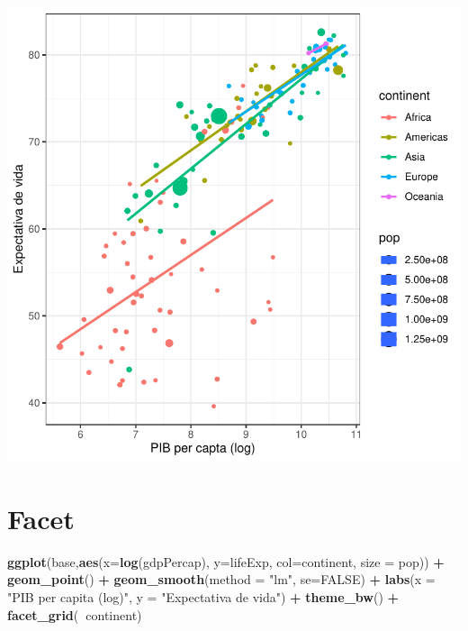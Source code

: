 \documentclass[
]{article}
\newenvironment{Shaded}{\begin{snugshade}}{\end{snugshade}}
\newcommand{\DataTypeTok}[1]{\textcolor[rgb]{0.13,0.29,0.53}{#1}}
\newcommand{\KeywordTok}[1]{\textcolor[rgb]{0.13,0.29,0.53}{\textbf{#1}}}
\newcommand{\NormalTok}[1]{#1}
\newcommand{\OperatorTok}[1]{\textcolor[rgb]{0.81,0.36,0.00}{\textbf{#1}}}
\newcommand{\OtherTok}[1]{\textcolor[rgb]{0.56,0.35,0.01}{#1}}
\newcommand{\StringTok}[1]{\textcolor[rgb]{0.31,0.60,0.02}{#1}}
\begin{document}
\begin{center}\includegraphics{arquivo_pdf_files/figure-latex/scatter4-1} \end{center}

\hypertarget{facet}{%
\section{Facet}\label{facet}}

\begin{Shaded}
\begin{Highlighting}[]
\KeywordTok{ggplot}\NormalTok{(base,}\KeywordTok{aes}\NormalTok{(}\DataTypeTok{x=}\KeywordTok{log}\NormalTok{(gdpPercap), }\DataTypeTok{y=}\NormalTok{lifeExp, }\DataTypeTok{col=}\NormalTok{continent,}
                \DataTypeTok{size =}\NormalTok{ pop)) }\OperatorTok{+}\StringTok{ }\KeywordTok{geom_point}\NormalTok{() }\OperatorTok{+}\StringTok{ }\KeywordTok{geom_smooth}\NormalTok{(}\DataTypeTok{method =} \StringTok{"lm"}\NormalTok{, }\DataTypeTok{se=}\OtherTok{FALSE}\NormalTok{) }\OperatorTok{+}\StringTok{ }
\StringTok{  }\KeywordTok{labs}\NormalTok{(}\DataTypeTok{x =} \StringTok{"PIB per capita (log)"}\NormalTok{, }\DataTypeTok{y =} \StringTok{"Expectativa de vida"}\NormalTok{) }\OperatorTok{+}\StringTok{ }\KeywordTok{theme_bw}\NormalTok{() }\OperatorTok{+}\StringTok{ }
\StringTok{  }\KeywordTok{facet_grid}\NormalTok{(}\OperatorTok{~}\NormalTok{continent)}
\end{Highlighting}
\end{Shaded}
\end{document}
